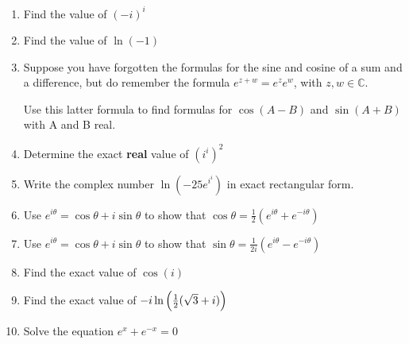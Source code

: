 \documentclass[../main.tex]{subfiles}
\begin{document}
\label{eulersformula}
\begin{enumerate}
    \item 
    Find the value of \((-i)^i\)

    \item 
    Find the value of \(\ln{(-1)}\)

    \item 
    Suppose you have forgotten the formulas for the sine and cosine of a sum and a difference, but do remember the formula \(e^{z+w}=e^z e^w\), with \(z, w \in \mathbb{C} \).

    Use this latter formula to find formulas for \(\cos{(A-B)}\) and \(\sin{(A+B)}\) with A and B real.

    \item 
    Determine the exact \textbf{real} value of \((i^i)^{2}\)

    \item 
    Write the complex number \(\ln{(-25e^{i^{i}})}\) in exact rectangular form.

    \item 
    Use \(e^{i\theta}=\cos{\theta}+i\sin{\theta}\) to show that \(\cos{\theta}=\frac{1}{2}(e^{i\theta}+e^{-i\theta})\)

    \item 
    Use \(e^{i\theta}=\cos{\theta}+i\sin{\theta}\) to show that \(\sin{\theta}=\frac{1}{2i}(e^{i\theta}-e^{-i\theta})\)

    \item 
    Find the exact value of $\cos{(i)}$

    \item 
    Find the exact value of $-i\ln{\Bigl(\frac{1}{2}(\sqrt{3}+i)\Bigr)}$

    \item 
    Solve the equation $e^x+e^{-x}=0$
\end{enumerate}
\end{document}
